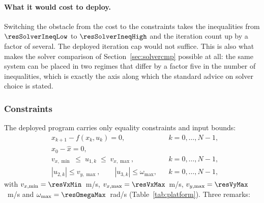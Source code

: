 \documentclass[11pt,a4paper]{article}
\begin{document}
\paragraph{What it would cost to deploy.} Switching the obstacle from the cost to the constraints takes the
inequalities from $\resSolverIneqLow$ to $\resSolverIneqHigh$ and the iteration count up by a factor of
several. The deployed iteration cap would not suffice. This is also what makes the solver comparison of
Section~\ref{sec:solvercmp} possible at all: the same system can be placed in two regimes that differ by a
factor five in the number of inequalities, which is exactly the axis along which the standard advice on
solver choice is stated.

\subsubsection{Constraints}
\label{sec:constraints}

The deployed program carries only equality constraints and input bounds:
\begin{subequations}
\label{eq:cons}
\begin{align}
  & x_{k+1}-f(x_k,u_k)=0, && k=0,\dots,N-1, \label{eq:cons-dyn}\\
  & x_0-\hat x=0, \label{eq:cons-init}\\
  & v_{x,\min}\;\le\;u_{1,k}\;\le\;v_{x,\max}, && k=0,\dots,N-1, \label{eq:cons-vx}\\
  & |u_{2,k}|\le v_{y,\max},\qquad |u_{3,k}|\le\omega_{\max}, && k=0,\dots,N-1, \label{eq:cons-vyw}
\end{align}
\end{subequations}
with $v_{x,\min}=\resVxMin$~m/s, $v_{x,\max}=\resVxMax$~m/s, $v_{y,\max}=\resVyMax$~m/s and
$\omega_{\max}=\resOmegaMax$~rad/s (Table~\ref{tab:platform}). Three remarks:
\end{document}
